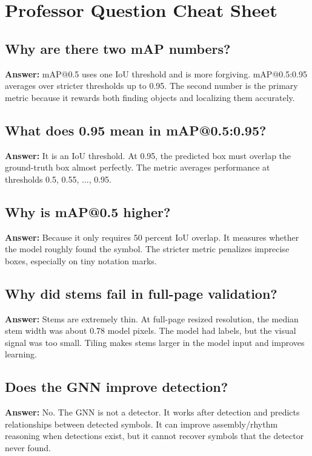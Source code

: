 \documentclass[11pt]{article}
\begin{document}
\section{Professor Question Cheat Sheet}

\subsection{Why are there two mAP numbers?}

\textbf{Answer:} mAP@0.5 uses one IoU threshold and is more forgiving. mAP@0.5:0.95 averages over stricter thresholds up to 0.95. The second number is the primary metric because it rewards both finding objects and localizing them accurately.

\subsection{What does 0.95 mean in mAP@0.5:0.95?}

\textbf{Answer:} It is an IoU threshold. At 0.95, the predicted box must overlap the ground-truth box almost perfectly. The metric averages performance at thresholds 0.5, 0.55, ..., 0.95.

\subsection{Why is mAP@0.5 higher?}

\textbf{Answer:} Because it only requires 50 percent IoU overlap. It measures whether the model roughly found the symbol. The stricter metric penalizes imprecise boxes, especially on tiny notation marks.

\subsection{Why did stems fail in full-page validation?}

\textbf{Answer:} Stems are extremely thin. At full-page resized resolution, the median stem width was about 0.78 model pixels. The model had labels, but the visual signal was too small. Tiling makes stems larger in the model input and improves learning.

\subsection{Does the GNN improve detection?}

\textbf{Answer:} No. The GNN is not a detector. It works after detection and predicts relationships between detected symbols. It can improve assembly/rhythm reasoning when detections exist, but it cannot recover symbols that the detector never found.
\end{document}

